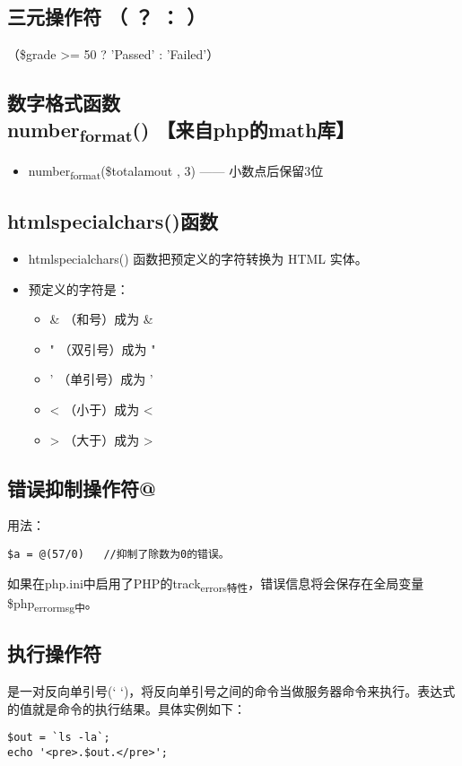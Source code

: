 \documentclass[11pt]{article}
\begin{document}
\subsection{三元操作符 （ ？ ： ）}
\label{sec:org85490df}
（\$grade >= 50 ? 'Passed' : 'Failed'）
\subsection{数字格式函数number\textsubscript{format}() 【来自php的math库】}
\label{sec:org34616ea}
\begin{itemize}
\item number\textsubscript{format}(\$totalamout , 3) —— 小数点后保留3位
\end{itemize}
\subsection{htmlspecialchars()函数}
\label{sec:orgdfbdefa}
\begin{itemize}
\item htmlspecialchars() 函数把预定义的字符转换为 HTML 实体。
\item 预定义的字符是：
\begin{itemize}
\item \& （和号）成为 \&
\item " （双引号）成为 "
\item ' （单引号）成为 '
\item < （小于）成为 <
\item > （大于）成为 >
\end{itemize}
\end{itemize}
\subsection{错误抑制操作符@}
\label{sec:org19bf4b9}
用法：
\begin{verbatim}
$a = @(57/0)   //抑制了除数为0的错误。
\end{verbatim}
如果在php.ini中启用了PHP的track\textsubscript{errors特性}，错误信息将会保存在全局变量\$php\textsubscript{errormsg中}。
\subsection{执行操作符}
\label{sec:orgb75f117}
是一对反向单引号(` `)，将反向单引号之间的命令当做服务器命令来执行。表达式的值就是命令的执行结果。具体实例如下：
\begin{verbatim}
$out = `ls -la`;
echo '<pre>.$out.</pre>';
\end{verbatim}
\end{document}
